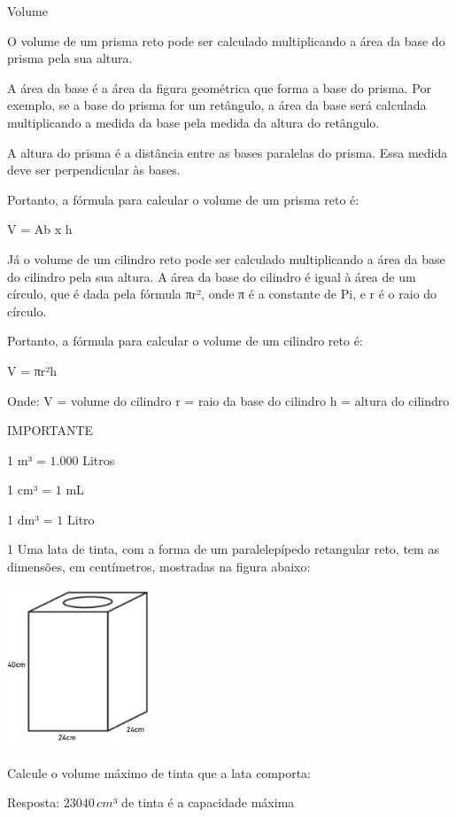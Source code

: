 Volume

O volume de um prisma reto pode ser calculado multiplicando a área da
base do prisma pela sua altura.

A área da base é a área da figura geométrica que forma a base do prisma.
Por exemplo, se a base do prisma for um retângulo, a área da base será
calculada multiplicando a medida da base pela medida da altura do
retângulo.

A altura do prisma é a distância entre as bases paralelas do prisma.
Essa medida deve ser perpendicular às bases.

Portanto, a fórmula para calcular o volume de um prisma reto é:

V = Ab x h

Já o volume de um cilindro reto pode ser calculado multiplicando a área
da base do cilindro pela sua altura. A área da base do cilindro é igual
à área de um círculo, que é dada pela fórmula πr², onde π é a constante
de Pi, e r é o raio do círculo.

Portanto, a fórmula para calcular o volume de um cilindro reto é:

V = πr²h

Onde: V = volume do cilindro r = raio da base do cilindro h = altura do
cilindro

IMPORTANTE

1 m³ = $1.000$ Litros

1 cm³ = $1$ mL

1 dm³ = $1$ Litro


\num{1}  Uma lata de tinta, com a forma de um paralelepípedo retangular reto,
tem as dimensões, em centímetros, mostradas na figura abaixo:

\includegraphics[width=1.69792in,height=1.88115in]{./imgSAEB_6_MAT/media/image95.png}

Calcule o volume máximo de tinta que a lata comporta:

Resposta: $23040\,cm$³ de tinta é a capacidade máxima

